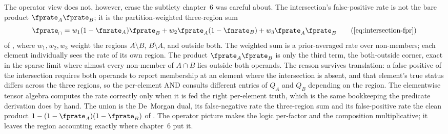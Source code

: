The operator view does not, however, erase the subtlety chapter~6 was careful
about. The intersection's false-positive rate is not the bare product $\fprate_A
\fprate_B$; it is the partition-weighted three-region sum
\[
  \fprate_\cap
  = w_1 (1 - \fnrate_A)\fprate_B
  + w_2 \fprate_A (1 - \fnrate_B)
  + w_3 \fprate_A \fprate_B
  \tag{\Cref{eq:intersection-fpr}}
\]
of , where $w_1, w_2, w_3$ weight the regions
$A \setminus B$, $B \setminus A$, and outside both. The weighted sum is a
prior-averaged rate over non-members; each element individually sees the
rate of its own region. The product $\fprate_A
\fprate_B$ is only the third term, the both-outside corner, exact in the sparse
limit where almost every non-member of $A \cap B$ lies outside both operands.
The reason survives translation: a false positive of the intersection requires
both operands to report membership at an element where the intersection is
absent, and that element's true status differs across the three regions, so the
per-element AND consults different entries of $Q_A$ and $Q_B$ depending on the
region. The elementwise tensor algebra computes the rate correctly only when it
is fed the right per-element truth, which is the same bookkeeping the predicate
derivation does by hand. The union is the De~Morgan dual, its false-negative
rate the three-region sum  and its false-positive rate the
clean product $1 - (1 - \fprate_A)(1 - \fprate_B)$ of . The
operator picture makes the logic per-factor and the composition multiplicative;
it leaves the region accounting exactly where chapter~6 put it.
